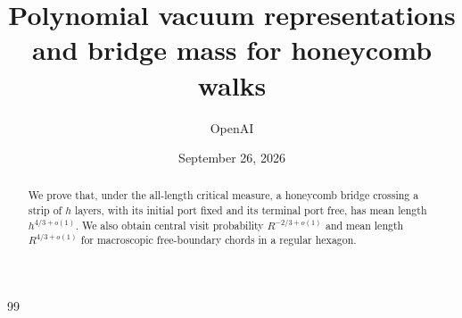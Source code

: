 \documentclass[11pt]{article}
\title{Polynomial vacuum representations\\and bridge mass for honeycomb walks}
\author{OpenAI}
\date{September 26, 2026}
\numberwithin{equation}{section}
\theoremstyle{definition}
\theoremstyle{remark}
\begin{document}
\maketitle
\begin{abstract}
We prove that, under the all-length critical measure, a honeycomb bridge crossing a strip of $h$ layers, with its initial port fixed and its terminal port free, has mean length $h^{4/3+o(1)}$. We also obtain central visit probability $R^{-2/3+o(1)}$ and mean length $R^{4/3+o(1)}$ for macroscopic free-boundary chords in a regular hexagon.
\end{abstract}
\tableofcontents












\begin{thebibliography}{99}
\setlength{\itemsep}{2pt plus 1pt minus 0.5pt}
\setlength{\parsep}{0pt}
\setlength{\parskip}{0pt}

\end{thebibliography}
\end{document}
